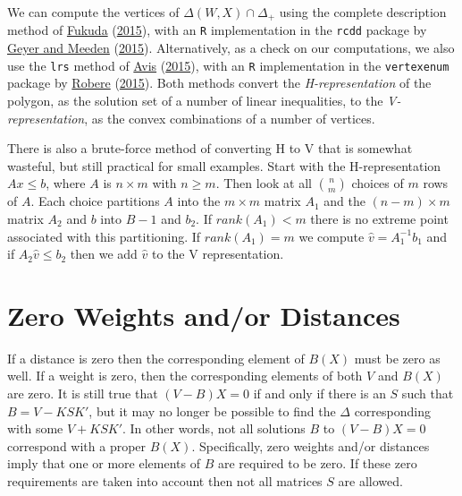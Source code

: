 \documentclass[
  12pt,
]{book}
\theoremstyle{definition}
\theoremstyle{definition}
\theoremstyle{definition}
\theoremstyle{definition}
\theoremstyle{remark}
\begin{document}
We can compute the vertices of \(\Delta(W,X)\cap\Delta_+\) using the complete description method of \protect\hyperlink{ref-fukuda_15}{Fukuda} (\protect\hyperlink{ref-fukuda_15}{2015}), with an \texttt{R} implementation in the \texttt{rcdd} package by \protect\hyperlink{ref-geyer_meeden_15}{Geyer and Meeden} (\protect\hyperlink{ref-geyer_meeden_15}{2015}). Alternatively, as a check on our computations, we also use the \texttt{lrs} method of \protect\hyperlink{ref-avis_15}{Avis} (\protect\hyperlink{ref-avis_15}{2015}), with an \texttt{R} implementation in the \texttt{vertexenum} package by \protect\hyperlink{ref-robere_15}{Robere} (\protect\hyperlink{ref-robere_15}{2015}). Both methods convert the \emph{H-representation} of the polygon, as the solution set of a number of linear inequalities, to the \emph{V-representation}, as the convex combinations of a number of vertices.

There is also a brute-force method of converting H to V that is somewhat wasteful, but still practical for small examples. Start with the H-representation \(Ax\leq b\), where \(A\) is \(n\times m\) with \(n\geq m\). Then look at all \(\binom{n}{m}\) choices of \(m\) rows of \(A\). Each choice partitions \(A\) into the \(m\times m\) matrix \(A_1\) and the \((n-m)\times m\) matrix \(A_2\) and \(b\) into \(B-1\) and \(b_2\). If \(rank(A_1)<m\) there is no extreme point associated with this partitioning. If \(rank(A_1)=m\) we compute \(\hat v=A_1^{-1}b_1\) and if \(A_2\hat v\leq b_2\) then we add \(\hat v\) to the V representation.

\hypertarget{zero-weights-andor-distances}{%
\section{Zero Weights and/or Distances}\label{zero-weights-andor-distances}}

If a distance is zero then the corresponding element of \(B(X)\) must be zero as well. If a weight is zero, then the corresponding elements of both \(V\) and \(B(X)\) are zero. It is still true that \((V-B)X=0\) if and only if there is an \(S\) such that \(B=V-KSK'\), but it may no longer be possible to find the \(\Delta\) corresponding with some \(V+KSK'\). In other words, not all solutions \(B\) to \((V-B)X=0\) correspond with a proper \(B(X)\). Specifically, zero weights and/or distances imply that one or more elements of \(B\) are required to be zero. If these zero requirements are taken into account then not all matrices \(S\) are allowed.
\end{document}
